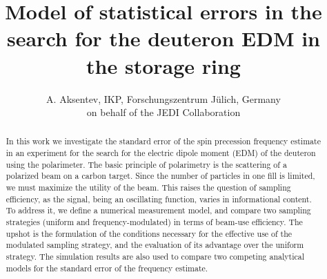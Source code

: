 \documentclass{article}
\begin{document}
	\title{Model of statistical errors in the search for the deuteron EDM in the storage ring}
	\author{A. Aksentev, IKP, Forschungszentrum J\"ulich, Germany\\ on behalf of the JEDI Collaboration}
	\date{}
	\maketitle

\begin{abstract}
In this work we investigate the standard error of the spin precession frequency estimate in an experiment for the search for the electric dipole moment (EDM) of the deuteron using the polarimeter. The basic principle of polarimetry is the scattering of a polarized beam on a carbon target. Since the number of particles in one fill is limited, we must maximize the utility of the beam. This raises the question of sampling efficiency, as the signal, being an oscillating function, varies in informational content. To address it, we define a numerical measurement model, and compare two sampling strategies (uniform and frequency-modulated) in terms of beam-use efficiency. The upshot is the formulation of the conditions necessary for the effective use of the modulated sampling strategy, and the evaluation of its advantage over the uniform strategy. The simulation results are also used to compare two competing analytical models for the standard error of the frequency estimate.
\end{abstract}
	
\end{document}
